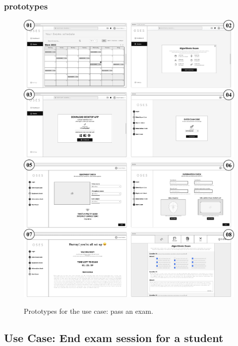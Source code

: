 \documentclass[]{uc2pfecaneva}
\begin{document}
\subsubsection{prototypes}
\begin{figure}[h]
	
	\centering
	\includegraphics[width=\textwidth]{images/prototypes_pass_exam1}
	\includegraphics[width=\textwidth]{images/prototypes_pass_exam2}
	
	\caption{Prototypes for the use case: pass an exam.}
\end{figure}
\clearpage



\raggedright\subsection{Use Case: End exam session for a student}
\end{document}

